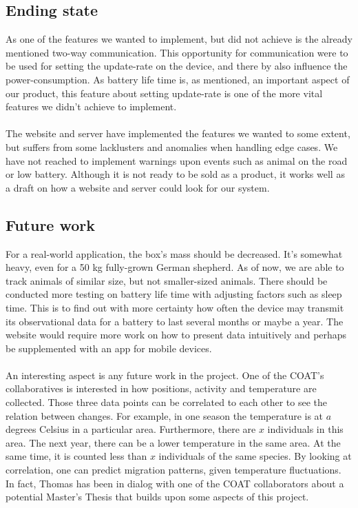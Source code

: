 	\subsection{Ending state}
		As one of the features we wanted to implement, but did not achieve is the already mentioned two-way communication. This opportunity for communication were to be used for setting the update-rate on the device, and there by also influence the power-consumption. As battery life time is, as mentioned, an important aspect of our product, this feature about setting update-rate is one of the more vital features we didn't achieve to implement. \\\\
		The website and server have implemented the features we wanted to some extent, but suffers from some lacklusters and anomalies when handling edge cases. We have not reached to implement warnings upon events such as animal on the road or low battery. Although it is not ready to be sold as a product, it works well as a draft on how a website and server could look for our system. 

	\subsection{Future work}
	For a real-world application, the box's mass should be decreased. It's somewhat heavy, even for a 50 kg 	fully-grown German shepherd. As of now, we are able to track animals of similar size, but not smaller-sized animals. There should be conducted more testing on battery life time with adjusting factors such as sleep time. This is to find out with more certainty how often the device may transmit its observational data for a battery to last several months or maybe a year. 
	The website would require more work on how to present data intuitively and perhaps be supplemented with an app for mobile devices.   
	\\\\
		An interesting aspect is any future work in the project. One of the COAT's collaboratives is interested in how positions, activity and temperature are collected. Those three data points can be correlated to each other to see the relation between changes. For example, in one season the temperature is at $a$ degrees Celsius in a particular area. Furthermore, there are $x$ individuals in this area. The next year, there can be a lower temperature in the same area. At the same time, it is counted less than $x$ individuals of the same species. By looking at correlation, one can predict migration patterns, given temperature fluctuations. In fact, Thomas has been in dialog with one of the COAT collaborators about a potential Master's Thesis that builds upon some aspects of this project. 
		
